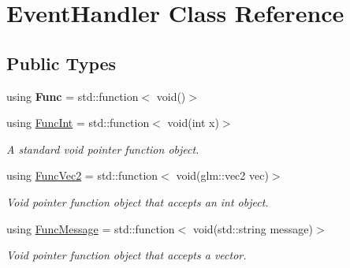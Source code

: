 \hypertarget{class_event_handler}{\section{Event\+Handler Class Reference}
\label{class_event_handler}
}
\subsection*{Public Types}
\begin{DoxyCompactItemize}
\item 
\hypertarget{class_event_handler_af1c003b45c76eb6eb0852801a997561b}{using {\bfseries Func} = std\+::function$<$ void()$>$}\label{class_event_handler_af1c003b45c76eb6eb0852801a997561b}

\item 
\hypertarget{class_event_handler_afc053859d1bdb89bd10f01ff22c99fed}{using \hyperlink{class_event_handler_afc053859d1bdb89bd10f01ff22c99fed}{Func\+Int} = std\+::function$<$ void(int x)$>$}\label{class_event_handler_afc053859d1bdb89bd10f01ff22c99fed}

\begin{DoxyCompactList}\small\item\em A standard void pointer function object. \end{DoxyCompactList}\item 
\hypertarget{class_event_handler_a814f37c7df5b2bf170d82904b3e525d6}{using \hyperlink{class_event_handler_a814f37c7df5b2bf170d82904b3e525d6}{Func\+Vec2} = std\+::function$<$ void(glm\+::vec2 vec)$>$}\label{class_event_handler_a814f37c7df5b2bf170d82904b3e525d6}

\begin{DoxyCompactList}\small\item\em Void pointer function object that accepts an int object. \end{DoxyCompactList}\item 
\hypertarget{class_event_handler_a21c76d0c722afe4925c87aa3544e2ce6}{using \hyperlink{class_event_handler_a21c76d0c722afe4925c87aa3544e2ce6}{Func\+Message} = std\+::function$<$ void(std\+::string message)$>$}\label{class_event_handler_a21c76d0c722afe4925c87aa3544e2ce6}

\begin{DoxyCompactList}\small\item\em Void pointer function object that accepts a vector. \end{DoxyCompactList}\end{DoxyCompactItemize}
